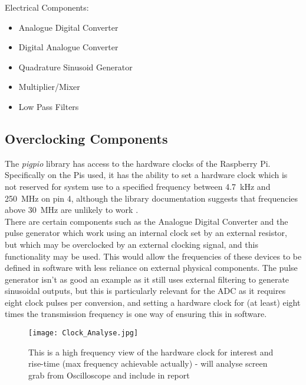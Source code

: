 \documentclass[../main.tex]{subfiles}
\begin{document}
Electrical Components:
\begin{itemize}
	\item Analogue Digital Converter
	\item Digital Analogue Converter
	\item Quadrature Sinusoid Generator
	\item Multiplier/Mixer
	\item Low Pass Filters
\end{itemize}

\subsection{Overclocking Components} \label{sec_Overclocking}

The \textit{pigpio} library has access to the hardware clocks of the Raspberry Pi.
Specifically on the Pis used, it has the ability to set a hardware clock which is not reserved for system use to a specified frequency between \SI{4.7}{\kilo\hertz} and \SI{250}{\mega\hertz} on pin 4, although the library documentation suggests that frequencies above \SI{30}{\mega\hertz} are unlikely to work \cite{lib_pigpioHWClock}.\\

There are certain components such as the Analogue Digital Converter and the pulse generator which work using an internal clock set by an external resistor, but which may be overclocked by an external clocking signal, and this functionality may be used.
This would allow the frequencies of these devices to be defined in software with less reliance on external physical components.
The pulse generator isn't as good an example as it still uses external filtering to generate sinusoidal outputs, but this is particularly relevant for the ADC as it requires eight clock pulses per conversion, and setting a hardware clock for (at least) eight times the transmission frequency is one way of ensuring this in software.\\

\begin{figure}[ht]
	\centering
	\texttt{[image: Clock\_Analyse.jpg]}
	\caption{This is a high frequency view of the hardware clock for interest and rise-time (max frequency achievable actually) - will analyse screen grab from Oscilloscope and include in report}
\end{figure}
\end{document}
